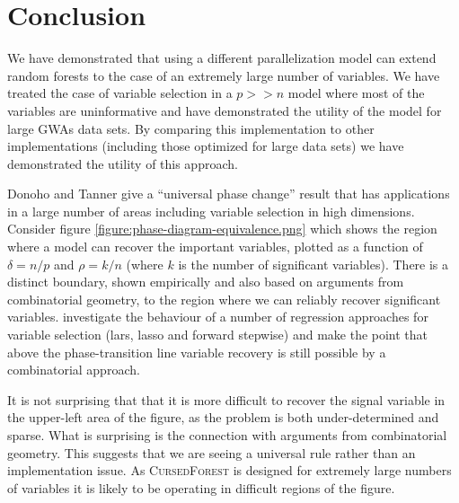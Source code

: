 \documentclass[10pt,letterpaper]{article}
\newcommand{\cursedforest}{\textsc{CursedForest}\xspace}
\newcommand{\mtry}{\texttt{mtry}\xspace}
\begin{document}




\section{Conclusion}
We have demonstrated that using a different parallelization model can extend random forests to the case of an
extremely large number of variables. We have treated the case of variable selection in a $p >> n$ model where most of
the variables are uninformative and have demonstrated the utility of the model for large GWAs data sets. By comparing
this implementation to other implementations (including those optimized for large data sets) we have demonstrated the
utility of this approach.

Donoho and Tanner \cite{Donoho.and.Tanner.2009} give a ``universal phase change'' result that has applications in a
large number of areas including variable selection in high dimensions. Consider figure
\ref{figure:phase-diagram-equivalence.png} which shows the region where a model can recover the important variables,
plotted as a function of $\delta = n/p$ and $\rho =k/n$ (where $k$ is the number of significant variables). There is a
distinct boundary, shown empirically and also based on arguments from combinatorial geometry, to the region where we can
reliably recover significant variables.  \cite{Donoho.and.Stodden.2006} investigate the behaviour of a number of
regression approaches for variable selection (lars, lasso and forward stepwise) and make the point that above the
phase-transition line variable recovery is still possible by a combinatorial approach.

It is not surprising that that it is more difficult to recover the signal variable in the upper-left area of the figure,
as the problem is both under-determined and sparse. What is surprising is the connection with arguments from
combinatorial geometry. This suggests that we are seeing a universal rule rather than an implementation issue. As
\cursedforest is designed for extremely large numbers of variables it is likely to be operating in difficult regions of
the figure. 
\end{document}
